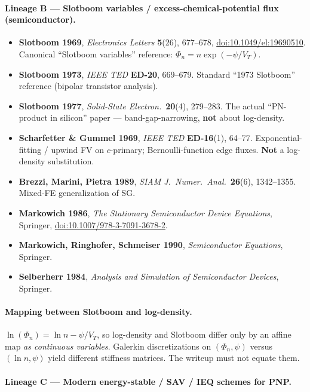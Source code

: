 \documentclass[11pt]{article}
\newcommand{\VT}{V_{T}}
\begin{document}
\paragraph{Lineage B --- Slotboom variables / excess-chemical-potential flux
(semiconductor).}
\begin{itemize}
\item \textbf{Slotboom 1969}, \emph{Electronics Letters} \textbf{5}(26),
      677--678,
      \href{https://doi.org/10.1049/el:19690510}{doi:10.1049/el:19690510}.
      Canonical ``Slotboom variables'' reference: $\Phi_n=n\exp(-\psi/\VT)$.
\item \textbf{Slotboom 1973}, \emph{IEEE TED} \textbf{ED-20}, 669--679.
      Standard ``1973 Slotboom'' reference (bipolar transistor analysis).
\item \textbf{Slotboom 1977}, \emph{Solid-State Electron.}\ \textbf{20}(4),
      279--283. The actual ``PN-product in silicon'' paper ---
      band-gap-narrowing, \textbf{not} about log-density.
\item \textbf{Scharfetter \& Gummel 1969}, \emph{IEEE TED} \textbf{ED-16}(1),
      64--77. Exponential-fitting / upwind FV on $c$-primary; Bernoulli-function
      edge fluxes. \textbf{Not} a log-density substitution.
\item \textbf{Brezzi, Marini, Pietra 1989}, \emph{SIAM J.~Numer.~Anal.}\
      \textbf{26}(6), 1342--1355. Mixed-FE generalization of SG.
\item \textbf{Markowich 1986}, \emph{The Stationary Semiconductor Device
      Equations}, Springer,
      \href{https://doi.org/10.1007/978-3-7091-3678-2}{doi:10.1007/978-3-7091-3678-2}.
\item \textbf{Markowich, Ringhofer, Schmeiser 1990}, \emph{Semiconductor
      Equations}, Springer.
\item \textbf{Selberherr 1984}, \emph{Analysis and Simulation of Semiconductor
      Devices}, Springer.
\end{itemize}

\paragraph{Mapping between Slotboom and log-density.}
$\ln(\Phi_n)=\ln n - \psi/\VT$, so log-density and Slotboom differ only by an
affine map \emph{as continuous variables}. Galerkin discretizations on
$(\Phi_n,\psi)$ versus $(\ln n,\psi)$ yield different stiffness matrices.
The writeup must not equate them.

\paragraph{Lineage C --- Modern energy-stable / SAV / IEQ schemes for PNP.}
\end{document}
